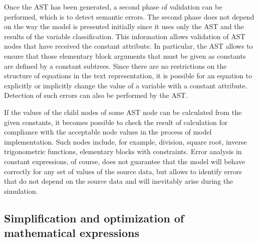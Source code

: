 \documentclass[lettersize,journal]{IEEEtran}
\begin{document}
Once the AST has been generated, a second phase of validation can be performed, which is to detect semantic errors. The second phase
does not depend on the way the model is presented initially since it uses only the AST and the results of the variable 
classification. This information allows validation of AST nodes that have received the constant attribute. In particular, 
the AST allows to ensure that those elementary block arguments that must be given as constants are defined by a constant subtrees. 
Since there are no restrictions on the structure of equations in the text representation, it is possible for an equation to explicitly
or implicitly change the value of a variable with a constant attribute. Detection of such errors can also be performed 
by the AST.

If the values of the child nodes of some AST node can be calculated from the given constants, it becomes possible to check 
the result of calculation for compliance with the acceptable node values in the process of model implementation. Such nodes 
include, for example, division, square root, inverse trigonometric functions, elementary blocks with constraints. 
Error analysis in constant expressions, of course, does not guarantee that the model will behave correctly for any set of values 
of the source data, but allows to identify errors that do not depend on the source data and will inevitably arise during the simulation.

\subsection {Simplification and optimization of mathematical expressions} \label{sec_simplification}
\end{document}
